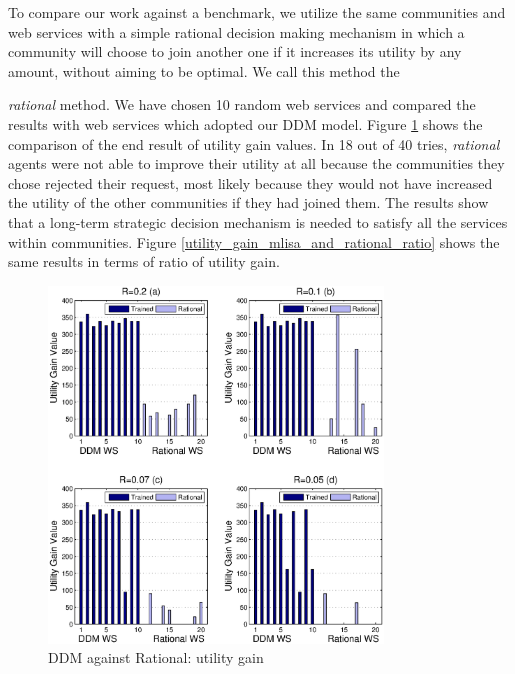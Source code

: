 To compare our work against a benchmark, we utilize the same communities and web services with a simple rational decision making mechanism in which a community will choose to join another one if it increases its utility by any amount, without aiming to be optimal. We call this method the {\textit{rational} method. We have chosen 10 random web services and compared the results with web services which adopted our DDM model. Figure \ref{utility_gain_mlisa_and_rational} shows the comparison of the end result of utility gain values. In 18 out of 40 tries, \emph{rational} agents were not able to improve their utility at all because the communities they chose rejected their request, most likely because they would not have increased the utility of the other communities if they had joined them. The results show that a long-term strategic decision mechanism is needed to satisfy all the services within communities. Figure \ref{utility_gain_mlisa_and_rational_ratio} shows the same results in terms of ratio of utility gain.

\begin{figure}%
\centering
\includegraphics[width=3.5in]{figures/utility_gain.eps}
\caption{DDM against Rational: utility gain }
\label{utility_gain_mlisa_and_rational}
\end{figure}

}
